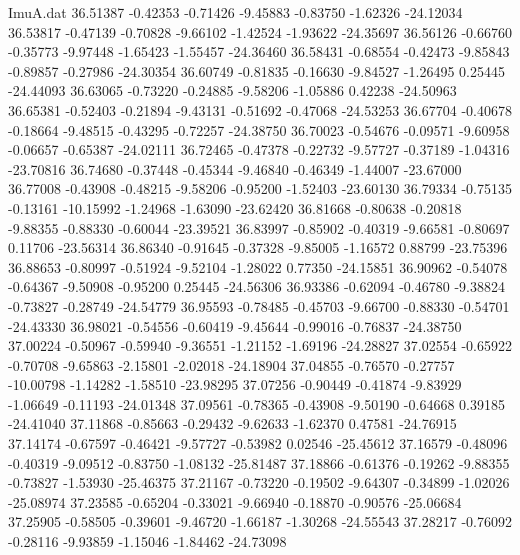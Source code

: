 \begin{filecontents}{ImuA.dat}
  36.51387   -0.42353   -0.71426   -9.45883   -0.83750   -1.62326  -24.12034
  36.53817   -0.47139   -0.70828   -9.66102   -1.42524   -1.93622  -24.35697
  36.56126   -0.66760   -0.35773   -9.97448   -1.65423   -1.55457  -24.36460
  36.58431   -0.68554   -0.42473   -9.85843   -0.89857   -0.27986  -24.30354
  36.60749   -0.81835   -0.16630   -9.84527   -1.26495    0.25445  -24.44093
  36.63065   -0.73220   -0.24885   -9.58206   -1.05886    0.42238  -24.50963
  36.65381   -0.52403   -0.21894   -9.43131   -0.51692   -0.47068  -24.53253
  36.67704   -0.40678   -0.18664   -9.48515   -0.43295   -0.72257  -24.38750
  36.70023   -0.54676   -0.09571   -9.60958   -0.06657   -0.65387  -24.02111
  36.72465   -0.47378   -0.22732   -9.57727   -0.37189   -1.04316  -23.70816
  36.74680   -0.37448   -0.45344   -9.46840   -0.46349   -1.44007  -23.67000
  36.77008   -0.43908   -0.48215   -9.58206   -0.95200   -1.52403  -23.60130
  36.79334   -0.75135   -0.13161  -10.15992   -1.24968   -1.63090  -23.62420
  36.81668   -0.80638   -0.20818   -9.88355   -0.88330   -0.60044  -23.39521
  36.83997   -0.85902   -0.40319   -9.66581   -0.80697    0.11706  -23.56314
  36.86340   -0.91645   -0.37328   -9.85005   -1.16572    0.88799  -23.75396
  36.88653   -0.80997   -0.51924   -9.52104   -1.28022    0.77350  -24.15851
  36.90962   -0.54078   -0.64367   -9.50908   -0.95200    0.25445  -24.56306
  36.93386   -0.62094   -0.46780   -9.38824   -0.73827   -0.28749  -24.54779
  36.95593   -0.78485   -0.45703   -9.66700   -0.88330   -0.54701  -24.43330
  36.98021   -0.54556   -0.60419   -9.45644   -0.99016   -0.76837  -24.38750
  37.00224   -0.50967   -0.59940   -9.36551   -1.21152   -1.69196  -24.28827
  37.02554   -0.65922   -0.70708   -9.65863   -2.15801   -2.02018  -24.18904
  37.04855   -0.76570   -0.27757  -10.00798   -1.14282   -1.58510  -23.98295
  37.07256   -0.90449   -0.41874   -9.83929   -1.06649   -0.11193  -24.01348
  37.09561   -0.78365   -0.43908   -9.50190   -0.64668    0.39185  -24.41040
  37.11868   -0.85663   -0.29432   -9.62633   -1.62370    0.47581  -24.76915
  37.14174   -0.67597   -0.46421   -9.57727   -0.53982    0.02546  -25.45612
  37.16579   -0.48096   -0.40319   -9.09512   -0.83750   -1.08132  -25.81487
  37.18866   -0.61376   -0.19262   -9.88355   -0.73827   -1.53930  -25.46375
  37.21167   -0.73220   -0.19502   -9.64307   -0.34899   -1.02026  -25.08974
  37.23585   -0.65204   -0.33021   -9.66940   -0.18870   -0.90576  -25.06684
  37.25905   -0.58505   -0.39601   -9.46720   -1.66187   -1.30268  -24.55543
  37.28217   -0.76092   -0.28116   -9.93859   -1.15046   -1.84462  -24.73098

\end{filecontents}
